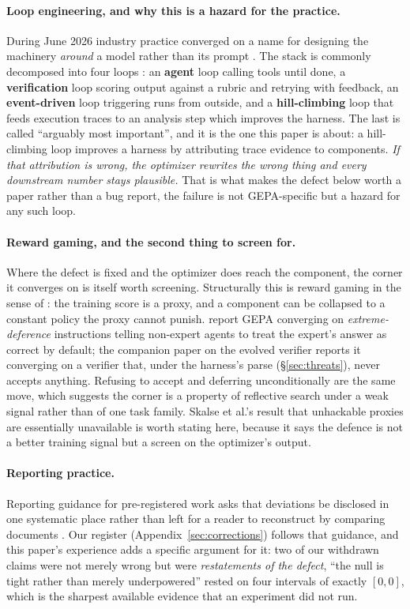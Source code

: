 \documentclass[11pt]{article}
\begin{document}
\paragraph{Loop engineering, and why this is a hazard for the practice.}
During June 2026 industry practice converged on a name for designing the machinery
\emph{around} a model rather than its prompt \citep{steinberger2026loops,osmani2026loop,swyx2026loopcraft}.
The stack is commonly decomposed into four loops \citep{langchain2026loopcraft}: an
\textbf{agent} loop calling tools until done, a \textbf{verification} loop scoring output against a
rubric and retrying with feedback, an \textbf{event-driven} loop triggering runs from outside, and a
\textbf{hill-climbing} loop that feeds execution traces to an analysis step which improves the
harness. The last is called ``arguably most important'', and it is the one this paper is about: a
hill-climbing loop improves a harness by attributing trace evidence to components. \emph{If that
attribution is wrong, the optimizer rewrites the wrong thing and every downstream number stays
plausible.} That is what makes the defect below worth a paper rather than a bug report, the
failure is not GEPA-specific but a hazard for any such loop.

\paragraph{Reward gaming, and the second thing to screen for.}
Where the defect is fixed and the optimizer does reach the component, the corner it converges on is
itself worth screening. Structurally this is reward gaming in the sense of
\citet{skalse2022reward}: the training score is a proxy, and a component can be collapsed to a
constant policy the proxy cannot punish. \citet{pappu2026multiagent} report GEPA converging on
\emph{extreme-deference} instructions telling non-expert agents to treat the expert's answer as
correct by default; the companion paper on the evolved verifier reports it converging on a verifier that,
under the harness's parse (\S\ref{sec:threats}), never accepts anything. Refusing to accept and deferring unconditionally are the same move, which
suggests the corner is a property of reflective search under a weak signal rather than of one task
family. Skalse et al.'s result that unhackable proxies are essentially unavailable is worth stating
here, because it says the defence is not a better training signal but a screen on the optimizer's
output.

\paragraph{Reporting practice.}
Reporting guidance for pre-registered work asks that deviations be disclosed in one systematic place
rather than left for a reader to reconstruct by comparing documents
\citep{willroth2024bestlaid}. Our register (Appendix~\ref{sec:corrections}) follows that guidance, and this
paper's experience adds a specific argument for it: two of our withdrawn claims were not merely
wrong but were \emph{restatements of the defect}, ``the null is tight rather than merely
underpowered'' rested on four intervals of exactly $[0,0]$, which is the sharpest available evidence
that an experiment did not run.
\end{document}
